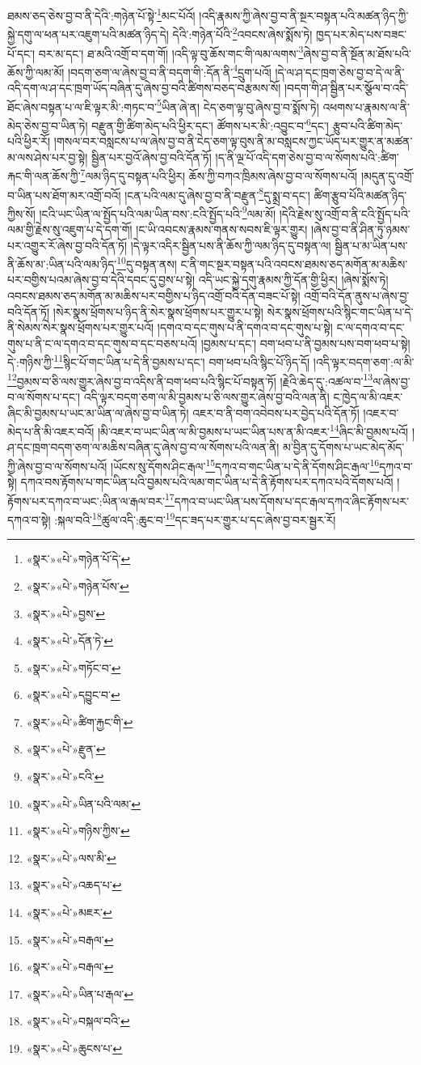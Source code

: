 ཐམས་ཅད་ཅེས་བྱ་བ་ནི་དེའི་:གཉེན་པོ་སྟེ་\footnote{«སྣར་»«པེ་»གཉེན་པོ་དེ་}མང་པོའོ། །འདི་རྣམས་ཀྱི་ཞེས་བྱ་བ་ནི་སྔར་བསྟན་པའི་མཚན་ཉིད་ཀྱི་སྐྱེ་དགུ་ལ་ཕན་པར་འཇུག་པའི་མཚན་ཉིད་དེ། དེའི་:གཉེན་པོའི་\footnote{«སྣར་»«པེ་»གཉེན་པོས་}འབངས་ཞེས་སྨོས་ཏེ། ཁྱད་པར་མེད་པས་བཟང་པོ་དང་། བར་མ་དང་། ཐ་མའི་འགྲོ་བ་དག་གོ། །འདི་ལྟ་བུ་ཆོས་གང་གི་ལམ་ལགས་\footnote{«སྣར་»«པེ་»བྱས་}ཞེས་བྱ་བ་ནི་སྔོན་མ་ཐོས་པའི་ཆོས་ཀྱི་ལམ་མོ། །བདག་ཅག་ལ་ཞེས་བྱ་བ་ནི་བདག་གི་:དོན་ནི་\footnote{«སྣར་»«པེ་»དོན་ཏེ་}དྲུག་པའོ། །དེ་ལ་ཤ་དང་ཁྲག་ཅེས་བྱ་བ་དེ་ལ་ནི་འདི་དག་ལ་ཤ་དང་ཁྲག་ཡོད་བཞིན་དུ་ཞེས་བྱ་བའི་ཚིགས་བཅད་བརྩམས་སོ། །བདག་གི་ཤ་སྦྱིན་པར་སྩོལ་བ་འདི་ཐོང་ཞེས་བསྟན་པ་ལ་ཇི་ལྟར་མི་:གཏང་བ་\footnote{«སྣར་»«པེ་»གཏོང་བ་}ཡིན་ཞེ་ན། ངེད་ཅག་ལྟ་བུ་ཞེས་བྱ་བ་སྨོས་ཏེ། འཕགས་པ་རྣམས་ལ་ནི་མེད་ཅེས་བྱ་བ་ཡིན་ཏེ། བརྫུན་གྱི་ཚིག་མེད་པའི་ཕྱིར་དང་། ཚོགས་པར་མི་:འབྱུང་བ་\footnote{«སྣར་»«པེ་»དབྱུང་བ་}དང་། རྩུབ་པའི་ཚིག་མེད་པའི་ཕྱིར་རོ། །གསལ་བར་བསླངས་པ་ལ་ཞེས་བྱ་བ་ནི་ངེད་ཅག་ལྟ་བུས་ནི་མ་བསླངས་ཀྱང་ཡོད་པར་གྱུར་ན་མཚན་མ་ལས་ཤེས་པར་བྱ་སྟེ། སྦྱིན་པར་བྱའོ་ཞེས་བྱ་བའི་དོན་ཏོ། །ད་ནི་ལྔ་པོ་འདི་དག་ཅེས་བྱ་བ་ལ་སོགས་པའི་:ཚིག་རྐང་གི་ལན་ཆོས་ཀྱི་\footnote{«སྣར་»«པེ་»ཚིག་རྐྱང་གི་}ལམ་ཉིད་དུ་བསྟན་པའི་ཕྱིར། ཆོས་ཀྱི་བཀའ་ཁྲིམས་ཞེས་བྱ་བ་ལ་སོགས་པའོ། །མདུན་དུ་འགྲོ་བ་ཡིན་པས་ཐོག་མར་འགྲོ་བའོ། །ངན་པའི་ལམ་དུ་ཞེས་བྱ་བ་ནི་བརྫུན་\footnote{«སྣར་»«པེ་»རྫུན་}དུ་སྨྲ་བ་དང་། ཚིག་རྩུབ་པོའི་མཚན་ཉིད་ཀྱིས་སོ། །ངའི་ཡང་ཡིན་ལ་སྤྱོད་པའི་ལམ་ཡིན་བས་:ངའི་སྤྱོད་པའི་\footnote{«སྣར་»«པེ་»ངའི་}ལམ་མོ། །དེའི་རྗེས་སུ་འགྲོ་བ་ནི་ངའི་སྤྱོད་པའི་ལམ་གྱི་རྗེས་སུ་འཇུག་པ་དེ་དག་གོ། །ང་ཡི་འབངས་རྣམས་གནས་སབས་ཇི་ལྟར་གྱུར། །ཞེས་བྱ་བ་ནི་ཤིན་ཏུ་ཉམས་པར་འགྱུར་རོ་ཞེས་བྱ་བའི་དོན་ཏོ། །དེ་ལྟར་འདིར་སྦྱིན་པས་ནི་ཆོས་ཀྱི་ལམ་ཉིད་དུ་བསྟན་ལ། སྦྱིན་པ་མ་ཡིན་པས་ནི་ཆོས་མ་:ཡིན་པའི་ལམ་ཉིད་\footnote{«སྣར་»«པེ་»ཡིན་པའི་ལམ་}དུ་བསྟན་ནས། ང་ནི་གང་སྔར་བསྟན་པའི་འབངས་ཐམས་ཅད་མགོན་མ་མཆིས་པར་བགྱིས་པའམ་ཞེས་བྱ་བ་དེའི་དབང་དུ་བྱས་པ་སྟེ། འདི་ཡང་སྐྱེ་དགུ་རྣམས་ཀྱི་དོན་གྱི་ཕྱིར། །ཞེས་སྨོས་ཏེ། འབངས་ཐམས་ཅད་མགོན་མ་མཆིས་པར་བགྱིས་པ་ཉིད་འགྲོ་བའི་དོན་བཟང་པོ་སྟེ། འགྲོ་བའི་དོན་ནུས་པ་ཞེས་བྱ་བའི་དོན་ཏོ། །སེར་སྣས་ཕྲོགས་པ་ཉིད་ནི་སེར་སྣས་ཕྲོགས་པར་གྱུར་པ་སྟེ། སེར་སྣས་ཕྲོགས་པའི་སྙིང་གང་ཡིན་པ་དེ་ནི་སེམས་སེར་སྣས་ཕྲོགས་པར་གྱུར་པའོ། །དགའ་བ་དང་གུས་པ་ནི་དགའ་བ་དང་གུས་པ་སྟེ། ང་ལ་དགའ་བ་དང་གུས་པ་ནི་ང་ལ་དགའ་བ་དང་གུས་བ་དང་བཅས་པའོ། །བྱམས་པ་དང་། བག་ཕབ་པ་ནི་བྱམས་པས་བག་ཕབ་པ་སྟེ། དེ་:གཉིས་ཀྱི་\footnote{«སྣར་»«པེ་»གཉིས་ཀྱིས་}སྙིང་པོ་གང་ཡིན་པ་དེ་ནི་བྱམས་པ་དང་། བག་ཕབ་པའི་སྙིང་པོ་ཉིད་དོ། །འདི་ལྟར་བདག་ཅག་:ལ་མི་\footnote{«སྣར་»«པེ་»ལས་མི་}བྱམས་བ་ཅི་ལས་གྱུར་ཞེས་བྱ་བ་འདིས་ནི་བག་ཕབ་པའི་སྙིང་པོ་བསྟན་ཏོ། །རྗེའི་ཆེད་དུ་:འཚལ་བ་\footnote{«སྣར་»«པེ་»འཆད་པ་}ལ་ཞེས་བྱ་བ་ལ་སོགས་པ་དང་། འདི་ལྟར་བདག་ཅག་ལ་མི་བྱམས་པ་ཅི་ལས་གྱུར་ཞེས་བྱ་བའི་ལན་ནི། ང་ཁྱེད་ལ་མི་འཇར་ཞིང་མི་བྱམས་པ་ཡང་མ་ཡིན་ལ་ཞེས་བྱ་བ་ཡིན་ཏེ། འཇར་བ་ནི་བག་འབེབས་པར་བྱེད་པའི་དོན་ཏོ། །འཇར་བ་མེད་པ་ནི་མི་འཇར་བའོ། །མི་འཇར་བ་ཡང་ཡིན་ལ་མི་བྱམས་པ་ཡང་ཡིན་པས་ན་མི་འཇར་\footnote{«སྣར་»«པེ་»མཇར་}ཞིང་མི་བྱམས་པའོ། །ཤ་དང་ཁྲག་བདག་ཅག་ལ་མཆིས་བཞིན་དུ་ཞེས་བྱ་བ་ལ་སོགས་པའི་ལན་ནི། མ་བྱིན་དུ་དོགས་པ་ཡང་མེད་མོད་ཀྱི་ཞེས་བྱ་བ་ལ་སོགས་པའོ། །ཡོངས་སུ་དོགས་ཤིང་རྒལ་\footnote{«སྣར་»«པེ་»བརྒལ་}དཀའ་བ་གང་ཡིན་པ་དེ་ནི་དོགས་ཤིང་རྒལ་\footnote{«སྣར་»«པེ་»བརྒལ་}དཀའ་བ་སྟེ། དཀའ་བས་རྟོགས་པ་གང་ཡིན་པའི་བྱམས་པའི་ལམ་གང་ཡིན་པ་དེ་ནི་རྟོགས་པར་དཀའ་པའི་དོགས་པའོ། །རྟོགས་པར་དཀའ་བ་ཡང་:ཡིན་ལ་རྒལ་བར་\footnote{«སྣར་»«པེ་»ཡིན་པ་རྒལ་}དཀའ་བ་ཡང་ཡིན་པས་དོགས་པ་དང་རྒལ་དཀའ་ཞིང་རྟོགས་པར་དཀའ་བ་སྟེ། :སྐལ་བའི་\footnote{«སྣར་»«པེ་»བསྐལ་བའི་}ཚུལ་འདི་:ཆུང་བ་\footnote{«སྣར་»«པེ་»ཆུངས་པ་}དང་ཟད་པར་གྱུར་པ་དང་ཞེས་བྱ་བར་སྦྱར་རོ། 